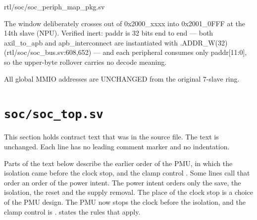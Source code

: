 \begin{relocated}{rtl/soc/soc_periph_map_pkg.sv}
\begin{textblock}
  The window deliberately crosses out of 0x2000_xxxx into 0x2001_0FFF at the
  14th slave (NPU). Verified inert: paddr is 32 bits end to end — both
  axil_to_apb and apb_interconnect are instantiated with .ADDR_W(32)
  (rtl/soc/soc_bus.sv:608,652) — and each peripheral consumes only
  paddr[11:0], so the upper-byte rollover carries no decode meaning.

  All global MMIO addresses are UNCHANGED from the original 7-slave ring.
\end{textblock}

\end{relocated}

\section{\texttt{soc/soc\_top.sv}}\label{ds:mod:soc-top}

This section holds contract text that was in the source file. The text is unchanged. Each line has no leading comment marker and no indentation.

\begin{information}
Parts of the text below describe the earlier order of the PMU, in which the isolation came before the clock stop, and the clamp control . Some lines call that order an order of the power intent. The power intent orders only the save, the isolation, the reset and the supply removal. The place of the clock stop is a choice of the PMU design. The PMU now stops the clock before the isolation, and the clamp control is .  states the rules that apply.
\end{information}


